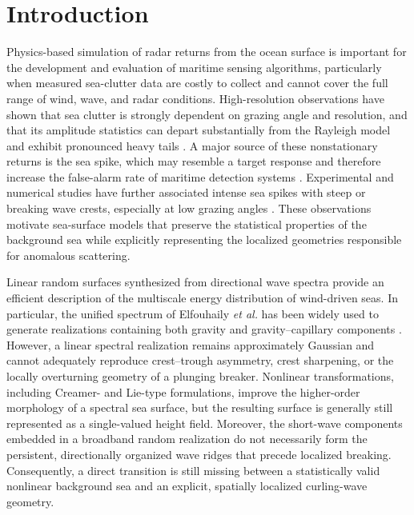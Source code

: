 
\section{Introduction}

Physics-based simulation of radar returns from the ocean surface is important for the development and evaluation of maritime sensing algorithms, particularly when measured sea-clutter data are costly to collect and cannot cover the full range of wind, wave, and radar conditions. High-resolution observations have shown that sea clutter is strongly dependent on grazing angle and resolution, and that its amplitude statistics can depart substantially from the Rayleigh model and exhibit pronounced heavy tails \cite{carretero2010statistical,fiche2015xband,bocquet2022lga}. A major source of these nonstationary returns is the sea spike, which may resemble a target response and therefore increase the false-alarm rate of maritime detection systems \cite{melief2006seaspikes,rosenberg2013seaspike}. Experimental and numerical studies have further associated intense sea spikes with steep or breaking wave crests, especially at low grazing angles \cite{holliday1998steepening,sletten2003breaking,west2002plunging}. These observations motivate sea-surface models that preserve the statistical properties of the background sea while explicitly representing the localized geometries responsible for anomalous scattering.

Linear random surfaces synthesized from directional wave spectra provide an efficient description of the multiscale energy distribution of wind-driven seas. In particular, the unified spectrum of Elfouhaily \emph{et al.} has been widely used to generate realizations containing both gravity and gravity--capillary components \cite{elfouhaily1997unified}. However, a linear spectral realization remains approximately Gaussian and cannot adequately reproduce crest--trough asymmetry, crest sharpening, or the locally overturning geometry of a plunging breaker. Nonlinear transformations, including Creamer- and Lie-type formulations, improve the higher-order morphology of a spectral sea surface, but the resulting surface is generally still represented as a single-valued height field. Moreover, the short-wave components embedded in a broadband random realization do not necessarily form the persistent, directionally organized wave ridges that precede localized breaking. Consequently, a direct transition is still missing between a statistically valid nonlinear background sea and an explicit, spatially localized curling-wave geometry.

